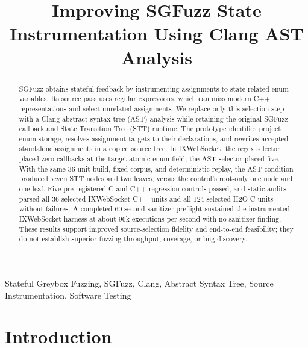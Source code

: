 \documentclass[conference]{IEEEtran}
\begin{document}
\title{Improving SGFuzz State Instrumentation Using Clang AST Analysis}

\author{
\and
{}
}
\maketitle

\begin{abstract}
SGFuzz obtains stateful feedback by instrumenting assignments to state-related
enum variables. Its source pass uses regular expressions, which can miss modern
C++ representations and select unrelated assignments. We replace only this
selection step with a Clang abstract syntax tree (AST) analysis while retaining
the original SGFuzz callback and State Transition Tree (STT) runtime. The
prototype identifies project enum storage, resolves assignment targets to their
declarations, and rewrites accepted standalone assignments in a copied source
tree. In IXWebSocket, the regex selector placed zero callbacks at the target
atomic enum field; the AST selector placed five. With the same 36-unit build,
fixed corpus, and deterministic replay, the AST condition produced seven STT
nodes and two leaves, versus the control's root-only one node and one leaf.
Five pre-registered C and C++ regression controls passed, and static audits
parsed all 36 selected IXWebSocket C++ units and all 124 selected H2O C units
without failures. A completed 60-second sanitizer preflight sustained the
instrumented IXWebSocket harness at about 96k executions per second with no
sanitizer finding. These results support improved source-selection fidelity and
end-to-end feasibility; they do not establish superior fuzzing throughput,
coverage, or bug discovery.
\end{abstract}

\begin{IEEEkeywords}
Stateful Greybox Fuzzing, SGFuzz, Clang, Abstract Syntax Tree, Source
Instrumentation, Software Testing
\end{IEEEkeywords}

\section{Introduction}
\end{document}
